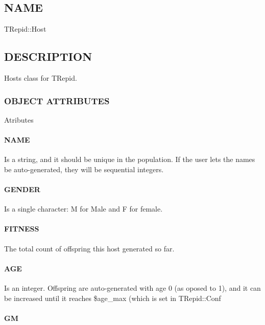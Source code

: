 \subsection{NAME\label{NAME}}


TRepid::Host

\subsection{DESCRIPTION\label{DESCRIPTION}}


Hosts class for TRepid.

\subsubsection*{OBJECT ATTRIBUTES\label{OBJECT_ATTRIBUTES}}


Atributes

\paragraph*{NAME\label{NAME}}


Is a string, and it should be unique in the population. If the user
lets the names be auto-generated, they will be sequential integers.

\paragraph*{GENDER\label{GENDER}}


Is a single character: M for Male and F for female.

\paragraph*{FITNESS\label{FITNESS}}


The total count of offspring this host generated so far.

\paragraph*{AGE\label{AGE}}


Is an integer. Offspring are auto-generated with age 0 (as oposed to
1), and it can be increased until it reaches \$age\_max (which is set in
TRepid::Conf

\paragraph*{GM\label{GM}}



